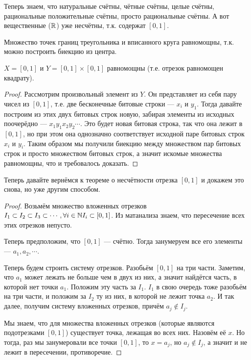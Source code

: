 Теперь знаем, что натуральные счётны, чётные счётны, целые счётны, рациональные положительные счётны, просто рациональные счётны. А вот вещественные ($\mathbb{R}$) уже несчётны, т.к. содержат $[0, 1]$.

\begin{example}
	Множество точек границ треугольника и вписанного круга равномощны, т.к. можно построить биекцию из центра. 
\end{example}

\begin{theorem}
	$X = [0, 1]$ и $Y = [0, 1] \times [0, 1]$ равномощны (т.е. отрезок равномощен квадрату).
\end{theorem}
\begin{proof}
	Рассмотрим произвольный элемент из $Y$. Он представляет из себя пару чисел из $[0, 1]$, т.е. две бесконечные битовые строки --- $x_i$ и $y_1$. Тогда давайте построим из этих двух битовых строк новую, забирая элементы из исходных поочерёдно --- $x_1 y_1 x_2 y_2 \cdots$. Это будет новая битовая строка, так что она лежит в $[0, 1]$, но при этом она однозначно соответствует исходной паре битовых строк $x_i$ и $y_i$. Таким образом мы получили биекцию между множеством пар битовых строк и просто множеством битовых строк, а значит искомые множества равномощны, что и требовалось доказать.
\end{proof}

Теперь давайте вернёмся к теореме о несчётности отрезка $[0, 1]$ и докажем это снова, но уже другим способом.

\begin{proof}
	Возьмём множество вложенных отрезков $I_1 \subset I_2 \subset I_3 \subset \cdots, \forall i \in \mathbb{N} I_i \subset [0, 1]$. Из матанализа знаем, что пересечение всех этих отрезков непусто. 

	Теперь предположим, что $[0, 1]$ --- счётно. Тогда занумеруем все его элементы --- $a_1, a_2, \cdots$. 

	Теперь будем строить систему отрезков. Разобьём $[0, 1]$ на три части. Заметим, что $a_1$ может лежать не больше чем в двух из них, а значит найдётся часть, в которой нет точки $a_1$. Положим эту часть за $I_1$. $I_1$ в свою очередь тоже разобьём на три части, и положим за $I_2$ ту из них, в которой не лежит точка $a_2$. И так далее, получим систему вложенных отрезков, причём $a_j \not \in I_j$.

	Мы знаем, что для множества вложенных отрезков (которые являются подотрезками $[0, 1]$) существует точка, лежащая во всех них. Назовём её $x$. Но тогда, раз мы занумеровали все точки $[0, 1]$, то $x = a_j$, но $a_j \not \in I_j$, а значит и не лежит в пересечении, противоречие.
\end{proof}

